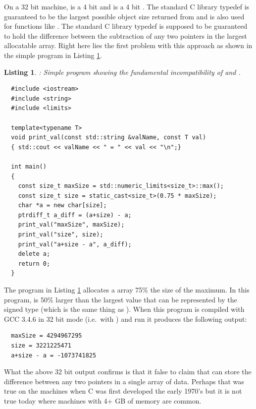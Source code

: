 \documentclass[pdf,ps2pdf,11pt]{SANDreport}
\newtheorem{listing}{Listing}
\begin{document}
On a 32 bit machine, {} is a 4 bit {}
and {} is a 4 bit {}.  The standard C library
typedef {} is guaranteed to be the largest possible
object size returned from {} and is also used for
functions like {}.  The standard C library typedef
{} is supposed to be guaranteed to hold the difference
between the subtraction of any two pointers in the largest allocatable
array.  Right here lies the first problem with this approach as shown
in the simple program in Listing
{}\ref{listing:size_t-ptrdiff_t-incompatibility}.


{}\begin{listing}: Simple program showing the fundamental
incompatibility of {} and {}.
\label{listing:size_t-ptrdiff_t-incompatibility}
{\small\begin{verbatim}
  #include <iostream> 
  #include <string> 
  #include <limits> 
   
  template<typename T> 
  void print_val(const std::string &valName, const T val) 
  { std::cout << valName << " = " << val << "\n";} 
   
  int main() 
  { 
    const size_t maxSize = std::numeric_limits<size_t>::max(); 
    const size_t size = static_cast<size_t>(0.75 * maxSize); 
    char *a = new char[size]; 
    ptrdiff_t a_diff = (a+size) - a; 
    print_val("maxSize", maxSize); 
    print_val("size", size); 
    print_val("a+size - a", a_diff); 
    delete a;
    return 0; 
  }
\end{verbatim}}
\end{listing}


The program in Listing
{}\ref{listing:size_t-ptrdiff_t-incompatibility} allocates a
{} array 75\% the size of the maximum.  In this program,
{} is 50\% larger than the largest value that can be
represented by the signed type {} (which is the same
thing as {}).  When this program is compiled with GCC 3.4.6
in 32 bit mode (i.e.\ with {}) and run it produces the
following output:

{\small\begin{verbatim}
  maxSize = 4294967295
  size = 3221225471
  a+size - a = -1073741825
\end{verbatim}}

What the above 32 bit output confirms is that it false to claim that
{} can store the difference between any two pointers
in a single array of data.  Perhaps that was true on the machines when
C was first developed the early 1970's but it is not true today where
machines with 4+ GB of memory are common.
\end{document}
